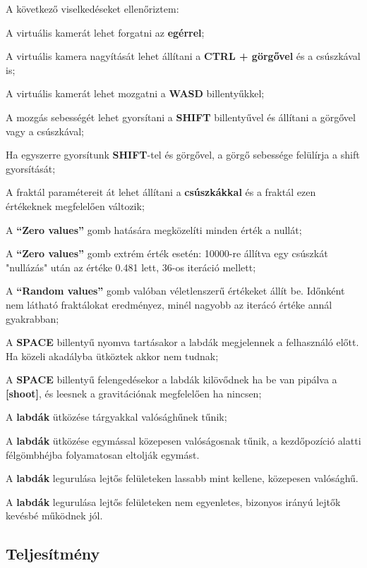A következő viselkedéseket ellenőriztem:
\begin{compactenum}
	\item A virtuális kamerát lehet forgatni az \textbf{egérrel};
	\item A virtuális kamera nagyítását lehet állítani a \textbf{CTRL + görgővel} és a csúszkával is;
	\item A virtuális kamerát lehet mozgatni a \textbf{WASD} billentyűkkel;
	\item A mozgás sebességét lehet gyorsítani a \textbf{SHIFT} billentyűvel és állítani a görgővel vagy a csúszkával;
	\item Ha egyszerre gyorsítunk \textbf{SHIFT}-tel és görgővel, a görgő sebessége felülírja a shift gyorsítását;
	\item A fraktál paramétereit át lehet állítani a \textbf{csúszkákkal} és a fraktál ezen értékeknek megfelelően változik;
	\item A \textbf{``Zero values''} gomb hatására megközelíti minden érték a nullát;
	\item A \textbf{``Zero values''} gomb extrém érték esetén: 10000-re állítva egy csúszkát "nullázás" után az értéke 0.481 lett, 36-os iteráció mellett;
	\item A \textbf{``Random values''} gomb valóban véletlenszerű értékeket állít be. Időnként nem látható fraktálokat eredményez, minél nagyobb az iterácó értéke annál gyakrabban;
	\item A \textbf{SPACE} billentyű nyomva tartásakor a labdák megjelennek a felhasználó előtt. Ha közeli akadályba ütköztek akkor nem tudnak;
	\item A \textbf{SPACE} billentyű felengedésekor a labdák kilövődnek ha be van pipálva a \textbf{[shoot]}, és leesnek a gravitációnak megfelelően ha nincsen;
	\item A \textbf{labdák} ütközése tárgyakkal valósághűnek tűnik;
	\item A \textbf{labdák} ütközése egymással közepesen valóságosnak tűnik, a kezdőpozíció alatti félgömbhéjba folyamatosan eltolják egymást.
	\item A \textbf{labdák} legurulása lejtős felületeken lassabb mint kellene, közepesen valósághű.
	\item A \textbf{labdák} legurulása lejtős felületeken nem egyenletes, bizonyos irányú lejtők kevésbé működnek jól.
\end{compactenum}

\cleardoublepage
\subsection{Teljesítmény}


